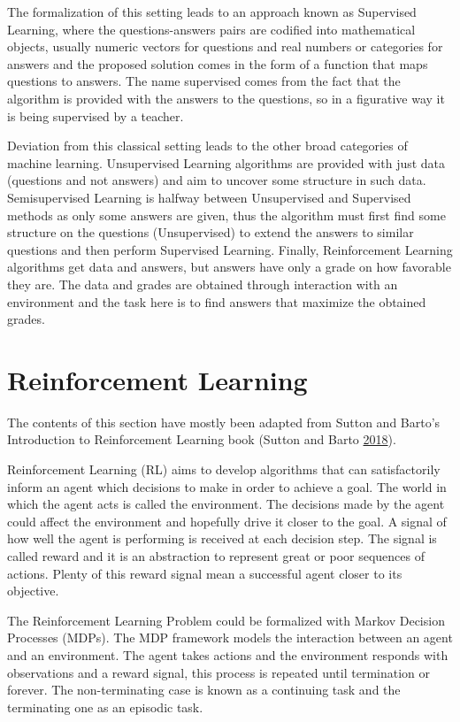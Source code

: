 \documentclass[
  openany]{book}
\begin{document}
The formalization of this setting leads to an approach known as Supervised Learning, where the questions-answers pairs are codified into mathematical objects, usually numeric vectors for questions and real numbers or categories for answers and the proposed solution comes in the form of a function that maps questions to answers. The name supervised comes from the fact that the algorithm is provided with the answers to the questions, so in a figurative way it is being supervised by a teacher.

Deviation from this classical setting leads to the other broad categories of machine learning. Unsupervised Learning algorithms are provided with just data (questions and not answers) and aim to uncover some structure in such data. Semisupervised Learning is halfway between Unsupervised and Supervised methods as only some answers are given, thus the algorithm must first find some structure on the questions (Unsupervised) to extend the answers to similar questions and then perform Supervised Learning. Finally, Reinforcement Learning algorithms get data and answers, but answers have only a grade on how favorable they are. The data and grades are obtained through interaction with an environment and the task here is to find answers that maximize the obtained grades.

\hypertarget{reinforcement-learning-1}{%
\section{Reinforcement Learning}\label{reinforcement-learning-1}}

The contents of this section have mostly been adapted from Sutton and Barto's Introduction to Reinforcement Learning book (Sutton and Barto \protect\hyperlink{ref-sutton2018reinforcement}{2018}).

Reinforcement Learning (RL) aims to develop algorithms that can satisfactorily inform an agent which decisions to make in order to achieve a goal. The world in which the agent acts is called the environment. The decisions made by the agent could affect the environment and hopefully drive it closer to the goal. A signal of how well the agent is performing is received at each decision step. The signal is called reward and it is an abstraction to represent great or poor sequences of actions. Plenty of this reward signal mean a successful agent closer to its objective.

The Reinforcement Learning Problem could be formalized with Markov Decision Processes (MDPs). The MDP framework models the interaction between an agent and an environment. The agent takes actions and the environment responds with observations and a reward signal, this process is repeated until termination or forever. The non-terminating case is known as a continuing task and the terminating one as an episodic task.
\end{document}
